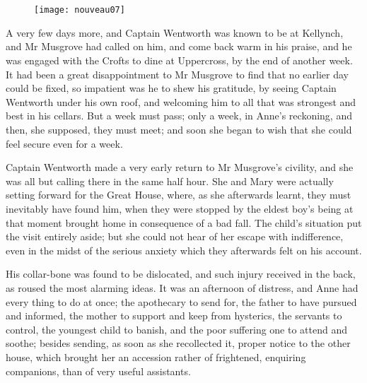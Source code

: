 \chapter[Chapter \thechapter]{}

\begin{figure}[t!]
\centering
\texttt{[image: nouveau07]}
\end{figure}

\lettrine[lines=4,lraise=0.3]{A}{} very few days more, and Captain Wentworth was known to be at Kellynch, and Mr Musgrove had called on him, and come back warm in his praise, and he was engaged with the Crofts to dine at Uppercross, by the end of another week. It had been a great disappointment to Mr Musgrove to find that no earlier day could be fixed, so impatient was he to shew his gratitude, by seeing Captain Wentworth under his own roof, and welcoming him to all that was strongest and best in his cellars. But a week must pass; only a week, in Anne's reckoning, and then, she supposed, they must meet; and soon she began to wish that she could feel secure even for a week.

Captain Wentworth made a very early return to Mr Musgrove's civility, and she was all but calling there in the same half hour. She and Mary were actually setting forward for the Great House, where, as she afterwards learnt, they must inevitably have found him, when they were stopped by the eldest boy's being at that moment brought home in consequence of a bad fall. The child's situation put the visit entirely aside; but she could not hear of her escape with indifference, even in the midst of the serious anxiety which they afterwards felt on his account.

His collar-bone was found to be dislocated, and such injury received in the back, as roused the most alarming ideas. It was an afternoon of distress, and Anne had every thing to do at once; the apothecary to send for, the father to have pursued and informed, the mother to support and keep from hysterics, the servants to control, the youngest child to banish, and the poor suffering one to attend and soothe; besides sending, as soon as she recollected it, proper notice to the other house, which brought her an accession rather of frightened, enquiring companions, than of very useful assistants.

